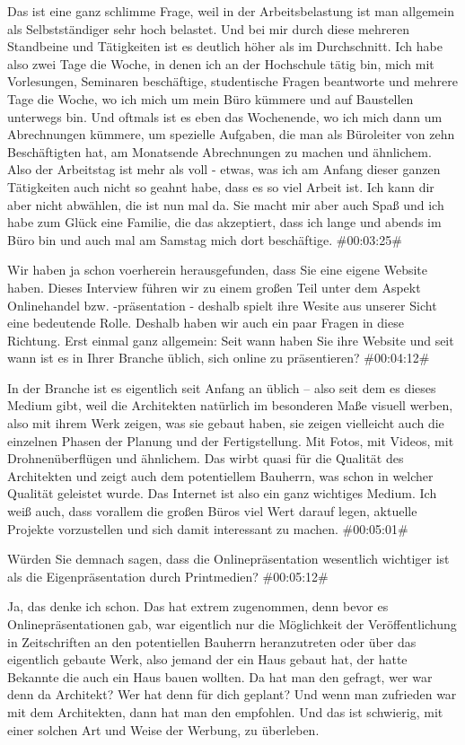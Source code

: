 \begin{description}
\Andre Das ist eine ganz schlimme Frage, weil in der Arbeitsbelastung ist man allgemein als Selbstständiger sehr hoch belastet. Und bei mir durch diese mehreren Standbeine und Tätigkeiten ist es deutlich höher als im Durchschnitt. Ich habe also zwei Tage die Woche, in denen ich an der Hochschule tätig bin, mich mit Vorlesungen, Seminaren beschäftige, studentische Fragen beantworte und mehrere Tage die Woche, wo ich mich um mein Büro kümmere und auf Baustellen unterwegs bin. Und oftmals ist es eben das Wochenende, wo ich mich dann um Abrechnungen kümmere, um spezielle Aufgaben, die man als Büroleiter von zehn Beschäftigten hat, am Monatsende Abrechnungen zu machen und ähnlichem. Also der Arbeitstag ist mehr als voll - etwas, was ich am Anfang dieser ganzen Tätigkeiten auch nicht so geahnt habe, dass es so viel Arbeit ist. Ich kann dir aber nicht abwählen, die ist nun mal da. Sie macht mir aber auch Spaß und ich habe zum Glück eine Familie, die das akzeptiert, dass ich lange und abends im Büro bin und auch mal am Samstag mich dort beschäftige. \#00:03:25\#

\Fabian Wir haben ja schon voerherein herausgefunden, dass Sie eine eigene Website haben. Dieses Interview führen wir zu einem großen Teil unter dem Aspekt Onlinehandel bzw. -präsentation - deshalb spielt ihre Wesite aus unserer Sicht eine bedeutende Rolle. Deshalb haben wir auch ein paar Fragen in diese Richtung. Erst einmal ganz allgemein: Seit wann haben Sie ihre Website und seit wann ist es in Ihrer Branche üblich, sich online zu präsentieren? \#00:04:12\#

\Andre In der Branche ist es eigentlich seit Anfang an üblich – also seit dem es dieses Medium gibt, weil die Architekten natürlich im besonderen Maße visuell werben, also mit ihrem Werk zeigen, was sie gebaut haben, sie zeigen vielleicht auch die einzelnen Phasen der Planung und der Fertigstellung. Mit Fotos, mit Videos, mit Drohnenüberflügen und ähnlichem. Das wirbt quasi für die Qualität des Architekten und zeigt auch dem potentiellem Bauherrn, was schon in welcher Qualität geleistet wurde. Das Internet ist also ein ganz wichtiges Medium. Ich weiß auch, dass vorallem die großen Büros viel Wert darauf legen, aktuelle Projekte vorzustellen und sich damit interessant zu machen. \#00:05:01\#

\Toni Würden Sie demnach sagen, dass die Onlinepräsentation wesentlich wichtiger ist als die Eigenpräsentation durch Printmedien? \#00:05:12\#

\Andre Ja, das denke ich schon. Das hat extrem zugenommen, denn bevor es Onlinepräsentationen gab, war eigentlich nur die Möglichkeit der Veröffentlichung in Zeitschriften an den potentiellen Bauherrn heranzutreten oder über das eigentlich gebaute Werk, also jemand der ein Haus gebaut hat, der hatte Bekannte die auch ein Haus bauen wollten. Da hat man den gefragt, wer war denn da Architekt? Wer hat denn für dich geplant? Und wenn man zufrieden war mit dem Architekten, dann hat man den empfohlen. Und das ist schwierig, mit einer solchen Art und Weise der Werbung, zu überleben.


\end{description}
